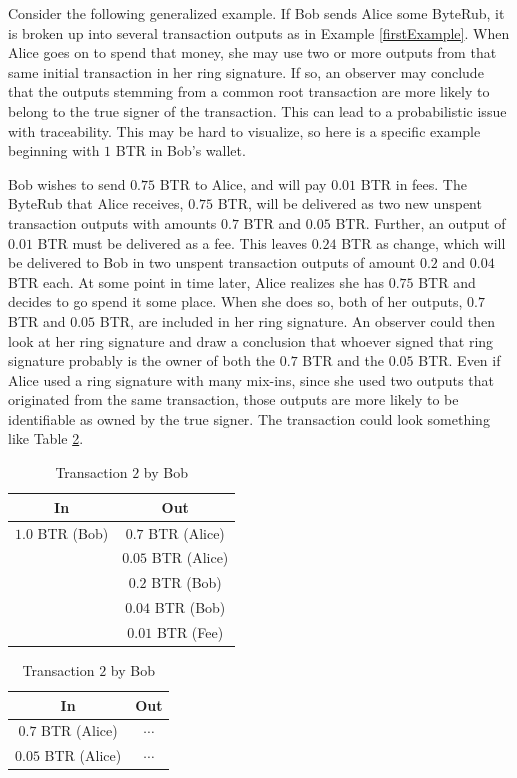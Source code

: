 \documentclass[12pt,english]{mrl}
\theoremstyle{definition}
\numberwithin{equation}{section}
\numberwithin{figure}{section}
\numberwithin{equation}{section}
\numberwithin{equation}{section}
\numberwithin{figure}{section}
\begin{document}
Consider the following generalized example. If Bob sends Alice some ByteRub, it is broken up into several transaction outputs as in Example \ref{firstExample}. When Alice goes on to spend that money, she may use two or more outputs from that same initial transaction in her ring signature. If so, an observer may conclude that the outputs stemming from a common root transaction are more likely to belong to the true signer of the transaction. This can lead to a probabilistic issue with traceability. This may be hard to visualize, so here is a specific example beginning with $1$ BTR in Bob's wallet. 

Bob wishes to send $0.75$ BTR to Alice, and will pay $0.01$ BTR in fees. The ByteRub that Alice receives, $0.75$ BTR, will be delivered as two new unspent transaction outputs with amounts $0.7$ BTR and $0.05$ BTR. Further, an output of $0.01$ BTR must be delivered as a fee. This leaves $0.24$ BTR as change, which will be delivered to Bob in two unspent transaction outputs of amount $0.2$ and $0.04$ BTR each. At some point in time later, Alice realizes she has $0.75$ BTR and decides to go spend it some place. When she does so, both of her outputs, $0.7$ BTR and $0.05$ BTR, are included in her ring signature. An observer could then look at her ring signature and draw a conclusion that whoever signed that ring signature probably is the owner of both the $0.7$ BTR and the $0.05$ BTR. Even if Alice used a ring signature with many mix-ins, since she used two outputs that originated from the same transaction, those outputs are more likely to be identifiable as owned by the true signer. The transaction could look something like Table \ref{linkByAssociation}.

\begin{table}[!htb]
    \caption{Linking transaction outputs by association}
    \label{linkByAssociation}
    \begin{subtable}{.5\linewidth}
      \centering
        \caption{Transaction $1$ by Bob}
        \begin{tabular}{|c|c|}\hline
            In & Out \\\hline
            $1.0$ BTR (Bob) & $0.7$ BTR (Alice)\\
             & $0.05$ BTR (Alice)\\
             & $0.2$ BTR (Bob)\\
             & $0.04$ BTR (Bob)\\
             & $0.01$ BTR (Fee)\\\hline
        \end{tabular}
    \end{subtable}%
    \begin{subtable}{.5\linewidth}
      \centering
        \caption{Transaction $2$ by Bob}
        \begin{tabular}{|c|c|}\hline
            In & Out \\\hline
            $0.7$ BTR (Alice) & $\cdots$ \\
            $0.05$ BTR (Alice) & $\cdots$ \\\hline
        \end{tabular}
    \end{subtable}%
\end{table}
 
\end{document}

